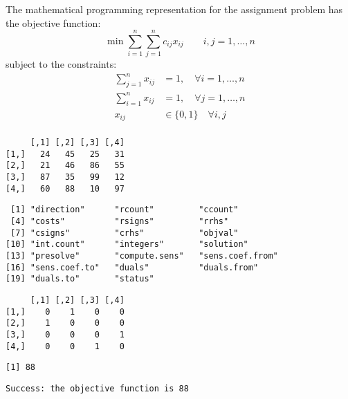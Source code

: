 The mathematical programming representation for the assignment problem has the objective function:\begin{equation}\label{OperResAssObj}
\min{ \sum_{i=1}^n {\sum_{j=1}^n {c_{ij}x_{ij}}}} \qquad i,j=1,\ldots,n
\end{equation}
subject to the constraints:
\begin{eqnarray*}
\sum_{j=1}^n {x_{ij}} &=1, \quad \forall  i=1,\ldots,n\\
\sum_{i=1}^n {x_{ij}} &=1, \quad \forall j=1,\ldots,n\\
x_{ij} &\in \{0,1\} \quad \forall i,j\\
\end{eqnarray*}
\begin{knitrout}
\color{fgcolor}\begin{kframe}
\begin{alltt}
\hlstd{> }
\hlstd{> }\hlstd{(}\hlstd{)}
\hlstd{> } \hlkwb{=} \hlstd{(}\hlstd{(}\hlopt{:}\hlstd{,} \hlstd{),} \hlstd{=}\hlstd{)}
\hlstd{> }
\end{alltt}
\begin{verbatim}
     [,1] [,2] [,3] [,4]
[1,]   24   45   25   31
[2,]   21   46   86   55
[3,]   87   35   99   12
[4,]   60   88   10   97
\end{verbatim}
\begin{alltt}
\hlstd{> } \hlkwb{=} 
\hlstd{> }
\end{alltt}
\begin{verbatim}
 [1] "direction"      "rcount"         "ccount"        
 [4] "costs"          "rsigns"         "rrhs"          
 [7] "csigns"         "crhs"           "objval"        
[10] "int.count"      "integers"       "solution"      
[13] "presolve"       "compute.sens"   "sens.coef.from"
[16] "sens.coef.to"   "duals"          "duals.from"    
[19] "duals.to"       "status"        
\end{verbatim}
\begin{alltt}
\hlstd{> }\hlopt{$}
\end{alltt}
\begin{verbatim}
     [,1] [,2] [,3] [,4]
[1,]    0    1    0    0
[2,]    1    0    0    0
[3,]    0    0    0    1
[4,]    0    0    1    0
\end{verbatim}
\begin{alltt}
\hlstd{> }\hlopt{$}
\end{alltt}
\begin{verbatim}
[1] 88
\end{verbatim}
\begin{alltt}
\hlstd{> }
\end{alltt}
\begin{verbatim}
Success: the objective function is 88 
\end{verbatim}
\end{kframe}
\end{knitrout}
